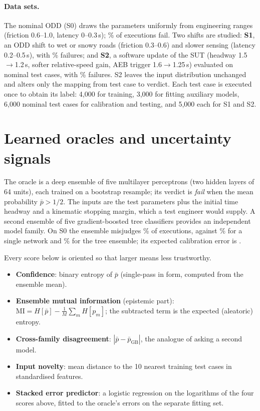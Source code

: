 \documentclass[10pt,a4paper]{article}
\begin{document}
\paragraph{Data sets.} The nominal ODD (S0) draws the parameters uniformly from engineering ranges (friction 0.6--1.0, latency 0--0.3\,s); \numFailSZero\% of executions fail. Two shifts are studied:
\textbf{S1}, an ODD shift to wet or snowy roads (friction 0.3--0.6) and slower sensing (latency 0.2--0.5\,s), with \numFailSOne\% failures; and
\textbf{S2}, a software update of the SUT (headway 1.5$\to$1.2\,s, softer relative-speed gain, AEB trigger 1.6$\to$1.25\,s) evaluated on nominal test cases, with \numFailSTwo\% failures. S2 leaves the input distribution unchanged and alters only the mapping from test case to verdict. Each test case is executed once to obtain its label: 4,000 for training, 3,000 for fitting auxiliary models, 6,000 nominal test cases for calibration and testing, and 5,000 each for S1 and S2.

\section{Learned oracles and uncertainty signals}
The oracle is a deep ensemble of five multilayer perceptrons (two hidden layers of 64 units), each trained on a bootstrap resample; its verdict is \emph{fail} when the mean probability $\bar p>1/2$. The inputs are the test parameters plus the initial time headway and a kinematic stopping margin, which a test engineer would supply. A second ensemble of five gradient-boosted tree classifiers provides an independent model family. On S0 the ensemble misjudges \numErrSZero\% of executions, against \numErrSingle\% for a single network and \numErrGB\% for the tree ensemble; its expected calibration error is \numEceSZero.

Every score below is oriented so that larger means less trustworthy.
\begin{itemize}\setlength\itemsep{1pt}
  \item \textbf{Confidence}: binary entropy of $\bar p$ (single-pass in form, computed from the ensemble mean).
  \item \textbf{Ensemble mutual information} (epistemic part): $\mathrm{MI}=H[\bar p]-\tfrac{1}{M}\sum_m H[p_m]$; the subtracted term is the expected (aleatoric) entropy.
  \item \textbf{Cross-family disagreement}: $|\bar p-\bar p_{\mathrm{GB}}|$, the analogue of asking a second model.
  \item \textbf{Input novelty}: mean distance to the 10 nearest training test cases in standardised features.
  \item \textbf{Stacked error predictor}: a logistic regression on the logarithms of the four scores above, fitted to the oracle's errors on the separate fitting set.
\end{itemize}
\end{document}
